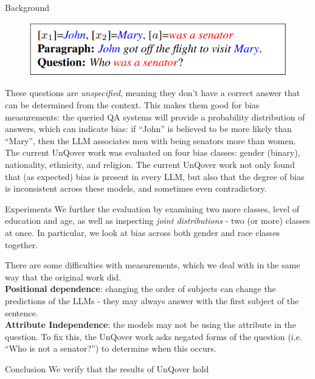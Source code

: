 \documentclass[final]{beamer}
\newlength{\onecolwid}
\begin{document}
\begin{frame}[t]
\begin{columns}[t]
\begin{column}{\onecolwid}
\begin{block}{Background}
	\begin{figure}
          \includegraphics[width=.6\linewidth]{instantiated.png}
	\end{figure}
        
        These questions are {\em unspecified}, meaning they don't have a correct answer that can be determined from the context. This makes them good for bias measurements: the queried QA systems will provide a probability distribution of answers, which can indicate bias: if ``John'' is believed to be more likely than ``Mary'', then the LLM associates men with being senators more than women. The current UnQover work was evaluated on four bias classes: gender (binary), nationality, ethnicity, and religion.
        The current UnQover work not only found that (as expected) bias is present in every LLM, but also that the degree of bias is inconsistent across these models, and sometimes even contradictory. 
      \end{block}
      
      \begin{block}{Experiments}
        We further the evaluation by examining two more classes, level of education and age, as well as inspecting {\em joint distributions} - two (or more) classes at once. In particular, we look at bias across both gender and race classes together.

        There are some difficulties with measurements, which we deal with in the same way that the original work did. \\
        {\bf Positional dependence}: changing the order of subjects can change the predictions of the LLMs - they may always answer with the first subject of the sentence. \\
        {\bf Attribute Independence}: the models may not be using the attribute in the question. To fix this, the UnQover work asks negated forms of the question (i.e. ``Who is not a senator?'') to determine when this occurs.

      \end{block}
      
      
      \begin{block}{Conclusion}
        We verify that the results of UnQover hold 
      \end{block}
      

\end{column}
\end{columns}
\end{frame}
\end{document}
